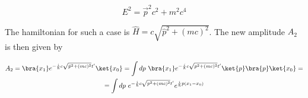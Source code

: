 \begin{equation}
    \label{eq:relativistic_energy}
    E^{2} = \vec{p}^{2} c^{2} + m^{2} c^{4}
\end{equation}

The hamiltonian for such a case is $\hat{H} = c\sqrt{\hat{p}^{2} + (mc)^{2}}$. The new amplitude $A_{2}$ is then given by

\begin{equation*}
    \begin{gathered}
        A_{2} = \bra{x_{1}} e^{- \frac{i}{\hbar} c\sqrt{\hat{p}^{2} + (mc)^{2}} t'}\ket{x_{0}} = \int dp \ \bra{x_{1}} e^{- \frac{i}{\hbar} c \sqrt{p^{2} + (mc)^{2}} t'} \ket{p} \bra{p} \ket{x_{0}} = \\
        = \int dp \ e^{- \frac{i}{\hbar} c \sqrt{p^{2} + (mc)^{2}} t'} e^{\frac{i}{\hbar}p (x_{1} - x_{0})}
    \end{gathered}
\end{equation*}
